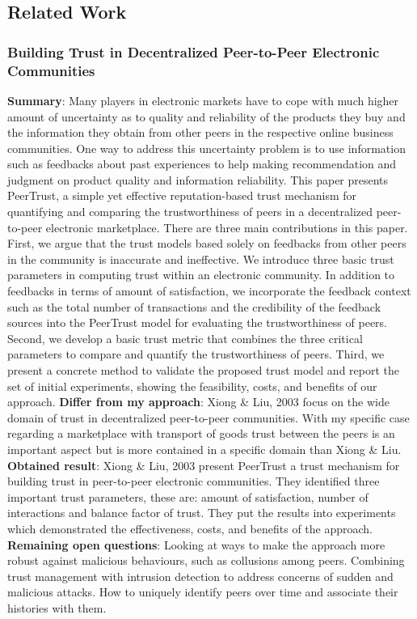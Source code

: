 \subsection{Related Work}

\subsubsection{Building Trust in Decentralized Peer-to-Peer Electronic Communities \cite{buildTrust}}
\textbf{Summary}: Many players in electronic markets have to cope with much higher amount of uncertainty as to quality and reliability of the products they buy and the information they obtain from other peers in the respective online business communities. One way to address this uncertainty problem is to use information such as feedbacks about past experiences to help making recommendation and judgment on product quality and information reliability. This paper presents PeerTrust, a simple yet effective reputation-based trust mechanism for quantifying and comparing the trustworthiness of peers in a decentralized peer-to-peer electronic marketplace. There are three main contributions in this paper. First, we argue that the trust models based solely on feedbacks from other peers in the community is inaccurate and ineffective. We introduce three basic trust parameters in computing trust within an electronic community. In addition to feedbacks in terms of amount of satisfaction, we incorporate the feedback context such as the total number of transactions and the credibility of the feedback sources into the PeerTrust model for evaluating the trustworthiness of peers. Second, we develop a basic trust metric that combines the three critical parameters to compare and quantify the trustworthiness of peers. Third, we present a concrete method to validate the proposed trust model and report the set of initial experiments, showing the feasibility, costs, and benefits of our approach.\newline
\textbf{Differ from my approach}: Xiong \& Liu, 2003 focus on the wide domain of trust in decentralized peer-to-peer communities. With my specific case regarding a marketplace with transport of goods trust between the peers is an important aspect but is more contained in a specific domain than Xiong \& Liu.\newline
\textbf{Obtained result}: Xiong \& Liu, 2003 present PeerTrust a trust mechanism for building trust in peer-to-peer electronic communities. They identified three important trust parameters, these are: amount of satisfaction, number of interactions and balance factor of trust. They put the results into experiments which demonstrated the effectiveness, costs, and benefits of the approach.\newline
\textbf{Remaining open questions}: Looking at ways to make the approach more robust against malicious behaviours, such as collusions among peers. Combining trust management with intrusion detection to address concerns of sudden and malicious attacks. How to uniquely identify peers over time and associate their histories with them.\newline

